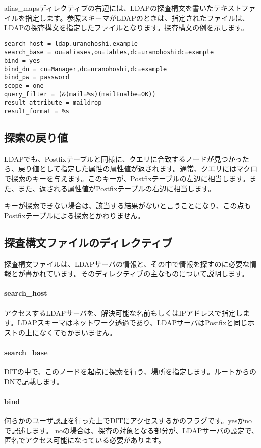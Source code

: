 alias\_mapsディレクティブの右辺には、LDAPの探査構文を書いたテキストファイルを指定します。参照スキーマがLDAPのときは、指定されたファイルは、LDAPの探査構文を指定したファイルとなります。探査構文の例を示します。

\begin{verbatim}
search_host = ldap.uranohoshi.example
search_base = ou=aliases,ou=tables,dc=uranohoshidc=example
bind = yes
bind_dn = cn=Manager,dc=uranohoshi,dc=example
bind_pw = password
scope = one
query_filter = (&(mail=%s)(mailEnalbe=OK))
result_attribute = maildrop
result_format = %s
\end{verbatim}

\subsection{探索の戻り値}

LDAPでも、Postfixテーブルと同様に、クエリに合致するノードが見つかったら、戻り値として指定した属性の属性値が返されます。通常、クエリにはマクロで探索のキーを与えます。このキーが、Postfixテーブルの左辺に相当します。また、また、返される属性値がPostfixテーブルの右辺に相当します。

キーが探索できない場合は、該当する結果がないと言うことになり、この点もPostfixテーブルによる探索とかわりません。


\subsection{探査構文ファイルのディレクティブ}

探査構文ファイルは、LDAPサーバの情報と、その中で情報を探すのに必要な情報とが書かれています。そのディレクティブの主なものについて説明します。

\paragraph{search\_host}
アクセスするLDAPサーバを、解決可能な名前もしくはIPアドレスで指定します。LDAPスキーマはネットワーク透過であり、LDAPサーバはPostfixと同じホストの上になくてもかまいません。

\paragraph{search\_base}
DITの中で、このノードを起点に探索を行う、場所を指定します。ルートからのDNで記載します。

\paragraph{bind}
何らかのユーザ認証を行った上でDITにアクセスするかのフラグです。yesかnoで記述します。
noの場合は、探査の対象となる部分が、LDAPサーバの設定で、匿名でアクセス可能になっている必要があります。

